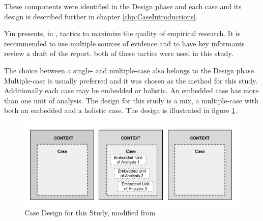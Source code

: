 These components were identified in the Design phase and each case and its design is described further in chapter \ref{chp:CaseIntroductions}.

Yin presents, in \cite{CaseStudyResearch}, tactics to maximize the quality of empirical research. It is recommended to use multiple sources of evidence and to have key informants review a draft of the report. both of these tactics were used in this study. %



The choice between a single- and multiple-case also belongs to the Design phase. Multiple-case is usually preferred \cite{CaseStudyResearch} and it was chosen as the method for this study. Additionally each case may be embedded or holistic. An embedded case has more than one unit of analysis. The design for this study is a mix, a multiple-case with both an embedded and a holistic case. %
The design is illustrated in figure \ref{fig:caseDesign}.

\begin{figure}[ht]
\hspace{-0.28cm}\includegraphics[scale=0.375]{caseStructure.png}
\caption[Case Design for this Study]{Case Design for this Study, modified from \cite{CaseStudyResearch}}
\label{fig:caseDesign}
\end{figure}

